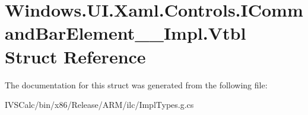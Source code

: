 \hypertarget{struct_windows_1_1_u_i_1_1_xaml_1_1_controls_1_1_i_command_bar_element_____impl_1_1_vtbl}{}\section{Windows.\+U\+I.\+Xaml.\+Controls.\+I\+Command\+Bar\+Element\+\_\+\+\_\+\+Impl.\+Vtbl Struct Reference}
\label{struct_windows_1_1_u_i_1_1_xaml_1_1_controls_1_1_i_command_bar_element_____impl_1_1_vtbl}


The documentation for this struct was generated from the following file\+:\begin{DoxyCompactItemize}
\item 
I\+V\+S\+Calc/bin/x86/\+Release/\+A\+R\+M/ilc/Impl\+Types.\+g.\+cs\end{DoxyCompactItemize}
